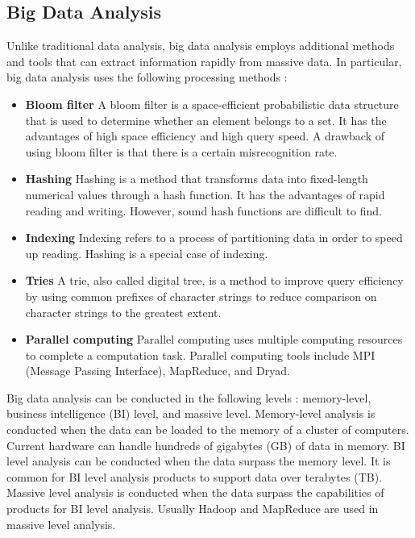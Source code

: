 \documentclass[]{book}
\theoremstyle{definition}
\theoremstyle{definition}
\theoremstyle{definition}
\theoremstyle{remark}
\begin{document}
\subsection{Big Data Analysis}\label{big-data-analysis}

Unlike traditional data analysis, big data analysis employs additional
methods and tools that can extract information rapidly from massive
data. In particular, big data analysis uses the following processing
methods \citep{chen2014b}:

\begin{itemize}
\item
  \textbf{Bloom filter} A bloom filter is a space-efficient
  probabilistic data structure that is used to determine whether an
  element belongs to a set. It has the advantages of high space
  efficiency and high query speed. A drawback of using bloom filter is
  that there is a certain misrecognition rate.
\item
  \textbf{Hashing} Hashing is a method that transforms data into
  fixed-length numerical values through a hash function. It has the
  advantages of rapid reading and writing. However, sound hash functions
  are difficult to find.
\item
  \textbf{Indexing} Indexing refers to a process of partitioning data in
  order to speed up reading. Hashing is a special case of indexing.
\item
  \textbf{Tries} A trie, also called digital tree, is a method to
  improve query efficiency by using common prefixes of character strings
  to reduce comparison on character strings to the greatest extent.
\item
  \textbf{Parallel computing} Parallel computing uses multiple computing
  resources to complete a computation task. Parallel computing tools
  include MPI (Message Passing Interface), MapReduce, and Dryad.
\end{itemize}

Big data analysis can be conducted in the following levels
\citep{chen2014b}: memory-level, business intelligence (BI) level, and
massive level. Memory-level analysis is conducted when the data can be
loaded to the memory of a cluster of computers. Current hardware can
handle hundreds of gigabytes (GB) of data in memory. BI level analysis
can be conducted when the data surpass the memory level. It is common
for BI level analysis products to support data over terabytes (TB).
Massive level analysis is conducted when the data surpass the
capabilities of products for BI level analysis. Usually Hadoop and
MapReduce are used in massive level analysis.
\end{document}

